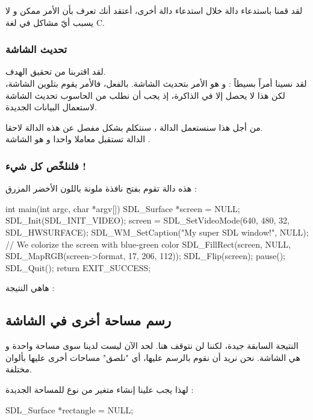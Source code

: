 لقد قمنا باستدعاء دالة خلال استدعاء دالة أخرى، أعتقد أنك تعرف بأن الأمر ممكن و لا يسبب أيّ مشاكل في لغة
\textenglish{C}.

\subsubsection{تحديث الشاشة}

لقد اقتربنا من تحقيق الهدف.\\
لقد نسينا أمراً بسيطاً : و هو الأمر بتحديث الشاشة. بالفعل، فالأمر 
يقوم بتلوين الشاشة، لكن هذا لا يحصل إلا في الذاكرة، إذ يجب أن نطلب من الحاسوب تحديث الشاشة لاستعمال البيانات الجديدة.

من أجل هذا سنستعمل الدالة 
،
سنتكلم بشكل مفصل عن هذه الدالة لاحقا.\\
الدالة تستقبل معاملا واحدا و هو الشاشة
.

\subsubsection{فلنلخّص كل شيء !}

هذه دالة
تقوم بفتح نافذة ملونة باللون الأخضر المزرق :

\begin{Csource}
int main(int argc, char *argv[])
{
	SDL_Surface *screen = NULL;
	SDL_Init(SDL_INIT_VIDEO);
	screen = SDL_SetVideoMode(640, 480, 32, SDL_HWSURFACE);
	SDL_WM_SetCaption("My super SDL window!", NULL);
	// We colorize the screen with blue-green color
	SDL_FillRect(screen, NULL, SDL_MapRGB(screen->format, 17, 206, 112));
	SDL_Flip(screen); 
	pause();
	SDL_Quit();
	return EXIT_SUCCESS;
}
\end{Csource}

هاهي النتيجة :


\subsection{رسم مساحة أخرى في الشاشة}

النتيجة السابقة جيدة، لكننا لن نتوقف هنا. لحد الآن ليست لدينا سوى مساحة واحدة و هي الشاشة. نحن نريد أن نقوم بالرسم عليها، أي "نلصق" مساحات أخرى عليها بألوان مختلفة.

لهذا يجب علينا إنشاء متغير من نوع
للمساحة الجديدة :

\begin{Csource}
SDL_Surface *rectangle = NULL;
\end{Csource}

